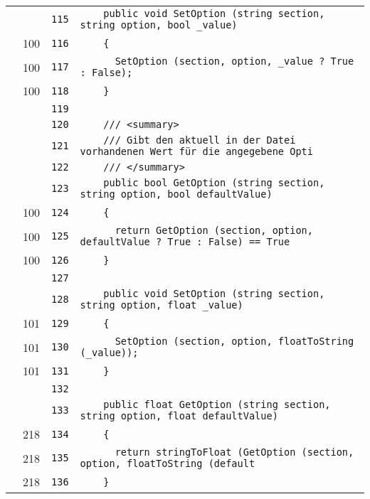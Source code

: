 \documentclass[a4paper,10pt]{article}
\begin{document}
\begin{longtable}[l]{lrrl}
\cellcolor{gray} &  & \verb~115~ & \verb~    public void SetOption (string section, string option, bool _value)~\\
\cellcolor{green} & 100 & \verb~116~ & \verb~    {~\\
\cellcolor{green} & 100 & \verb~117~ & \verb~      SetOption (section, option, _value ? True : False);~\\
\cellcolor{green} & 100 & \verb~118~ & \verb~    }~\\
\cellcolor{gray} &  & \verb~119~ & \verb~~\\
\cellcolor{gray} &  & \verb~120~ & \verb~    /// <summary>~\\
\cellcolor{gray} &  & \verb~121~ & \verb~    /// Gibt den aktuell in der Datei vorhandenen Wert für die angegebene Opti~\\
\cellcolor{gray} &  & \verb~122~ & \verb~    /// </summary>~\\
\cellcolor{gray} &  & \verb~123~ & \verb~    public bool GetOption (string section, string option, bool defaultValue)~\\
\cellcolor{green} & 100 & \verb~124~ & \verb~    {~\\
\cellcolor{green} & 100 & \verb~125~ & \verb~      return GetOption (section, option, defaultValue ? True : False) == True ~\\
\cellcolor{green} & 100 & \verb~126~ & \verb~    }~\\
\cellcolor{gray} &  & \verb~127~ & \verb~~\\
\cellcolor{gray} &  & \verb~128~ & \verb~    public void SetOption (string section, string option, float _value)~\\
\cellcolor{green} & 101 & \verb~129~ & \verb~    {~\\
\cellcolor{green} & 101 & \verb~130~ & \verb~      SetOption (section, option, floatToString (_value));~\\
\cellcolor{green} & 101 & \verb~131~ & \verb~    }~\\
\cellcolor{gray} &  & \verb~132~ & \verb~~\\
\cellcolor{gray} &  & \verb~133~ & \verb~    public float GetOption (string section, string option, float defaultValue)~\\
\cellcolor{green} & 218 & \verb~134~ & \verb~    {~\\
\cellcolor{green} & 218 & \verb~135~ & \verb~      return stringToFloat (GetOption (section, option, floatToString (default~\\
\cellcolor{green} & 218 & \verb~136~ & \verb~    }~\\

\end{longtable}
\end{document}
